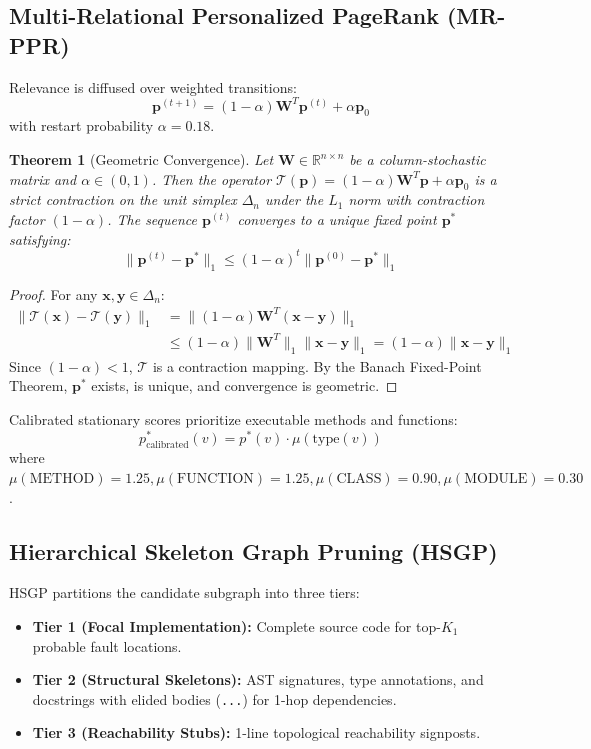 \documentclass[11pt,a4paper]{article}
\theoremstyle{plain}
\newtheorem{theorem}{Theorem}
\theoremstyle{definition}
\begin{document}
\subsection{Multi-Relational Personalized PageRank (MR-PPR)}
Relevance is diffused over weighted transitions:
\begin{equation}
\mathbf{p}^{(t+1)} = (1 - \alpha) \mathbf{W}^T \mathbf{p}^{(t)} + \alpha \mathbf{p}_0
\end{equation}
with restart probability $\alpha = 0.18$. 

\begin{theorem}[Geometric Convergence]
Let $\mathbf{W} \in \mathbb{R}^{n \times n}$ be a column-stochastic matrix and $\alpha \in (0, 1)$. Then the operator $\mathcal{T}(\mathbf{p}) = (1 - \alpha)\mathbf{W}^T\mathbf{p} + \alpha\mathbf{p}_0$ is a strict contraction on the unit simplex $\Delta_n$ under the $L_1$ norm with contraction factor $(1 - \alpha)$. The sequence $\mathbf{p}^{(t)}$ converges to a unique fixed point $\mathbf{p}^*$ satisfying:
\begin{equation}
\|\mathbf{p}^{(t)} - \mathbf{p}^*\|_1 \le (1 - \alpha)^t \|\mathbf{p}^{(0)} - \mathbf{p}^*\|_1
\end{equation}
\end{theorem}
\begin{proof}
For any $\mathbf{x}, \mathbf{y} \in \Delta_n$:
\begin{align*}
\|\mathcal{T}(\mathbf{x}) - \mathcal{T}(\mathbf{y})\|_1 &= \|(1 - \alpha)\mathbf{W}^T(\mathbf{x} - \mathbf{y})\|_1 \\
&\le (1 - \alpha) \|\mathbf{W}^T\|_1 \|\mathbf{x} - \mathbf{y}\|_1 = (1 - \alpha) \|\mathbf{x} - \mathbf{y}\|_1
\end{align*}
Since $(1 - \alpha) < 1$, $\mathcal{T}$ is a contraction mapping. By the Banach Fixed-Point Theorem, $\mathbf{p}^*$ exists, is unique, and convergence is geometric.
\end{proof}

Calibrated stationary scores prioritize executable methods and functions:
\begin{equation}
p^*_{\text{calibrated}}(v) = p^*(v) \cdot \mu(\text{type}(v))
\end{equation}
where $\mu(\text{METHOD}) = 1.25, \mu(\text{FUNCTION}) = 1.25, \mu(\text{CLASS}) = 0.90, \mu(\text{MODULE}) = 0.30$.

\subsection{Hierarchical Skeleton Graph Pruning (HSGP)}
HSGP partitions the candidate subgraph into three tiers:
\begin{itemize}[leftmargin=*]
  \item \textbf{Tier 1 (Focal Implementation):} Complete source code for top-$K_1$ probable fault locations.
  \item \textbf{Tier 2 (Structural Skeletons):} AST signatures, type annotations, and docstrings with elided bodies (\texttt{...}) for 1-hop dependencies.
  \item \textbf{Tier 3 (Reachability Stubs):} 1-line topological reachability signposts.
\end{itemize}
\end{document}
